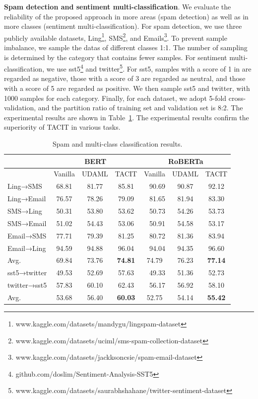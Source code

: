 \documentclass[letterpaper]{article} %
\begin{document}
\textbf{Spam detection and sentiment multi-classification}. We evaluate the reliability of the proposed approach in more areas (spam detection) as well as in more classes (sentiment multi-classification). For spam detection, we use three publicly available datasets, Ling\footnote{www.kaggle.com/datasets/mandygu/lingspam-dataset}, SMS\footnote{www.kaggle.com/datasets/uciml/sms-spam-collection-dataset}, and Emails\footnote{www.kaggle.com/datasets/jackksoncsie/spam-email-dataset}. To prevent sample imbalance, we sample the datas of different classes 1:1. The number of sampling is determined by the category that contains fewer samples. For sentiment multi-classification, we use sst5\footnote{github.com/doslim/Sentiment-Analysis-SST5} and twitter\footnote{www.kaggle.com/datasets/saurabhshahane/twitter-sentiment-dataset}. For sst5, samples with a score of 1 in are regarded as negative, those with a score of 3 are regarded as neutral, and those with a score of 5 are regarded as positive. We then sample sst5 and twitter, with 1000 samples for each category. Finally, for each dataset, we adopt 5-fold cross-validation, and the partition ratio of training set and validation set is 8:2. The experimental results are shown in Table~\ref{tab:a2}. The experimental results confirm the superiority of TACIT in various tasks.

\begin{table}[htbp]
	\renewcommand{\arraystretch}{0.9}
	\setlength\tabcolsep{0.1mm}
	\centering
	\begin{tabular}{lccc|ccc} \hline \hline
		& \multicolumn{3}{c}{BERT} & \multicolumn{3}{c}{RoBERTa} \\ \hline
		& \multicolumn{1}{l}{Vanilla} & UDAML  & \multicolumn{1}{l}{TACIT} & \multicolumn{1}{l}{Vanilla} & UDAML  & TACIT \\ \hline
		Ling→SMS & 68.81 & 81.77 & 85.81 & \multicolumn{1}{r}{90.69} & 90.87 & 92.12 \\
		Ling→Email & 76.57 & 78.26 & 79.09 & \multicolumn{1}{r}{81.65} & 81.94 & 83.30 \\
		SMS→Ling & 50.31 & 53.80 & 53.62 & \multicolumn{1}{r}{50.73} & 54.26 & 53.73 \\
		SMS→Email & 51.02 & 54.43 & 53.06 & \multicolumn{1}{r}{50.91} & 54.58 & 53.17 \\
		Email→SMS & 77.71 & 79.39 & 81.25 & \multicolumn{1}{r}{80.72} & 81.36 & 83.94 \\
		Email→Ling & 94.59 & 94.88 & 96.04 & \multicolumn{1}{r}{94.04} & 94.35 & 96.60 \\ \hline
		Avg.  & 69.84 & 73.76 & \textbf{74.81} & 74.79 & 76.23 & \textbf{77.14} \\ \hline \hline
		sst5→twitter & 49.53 & 52.69 & 57.63 & \multicolumn{1}{r}{49.33} & 51.36 & 52.73 \\
		twitter→sst5 & 57.83 & 60.10  & 62.43 & \multicolumn{1}{r}{56.17} & 56.92 & 58.10 \\ \hline
		Avg.  & 53.68 & 56.40  & \textbf{60.03} & 52.75 & 54.14 & \textbf{55.42} \\ \hline \hline
	\end{tabular}%
	\caption{Spam and multi-class classification results. }
	\label{tab:a2}%
\end{table}%
\end{document}
